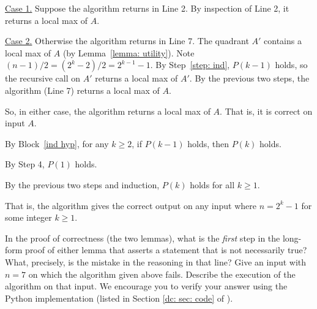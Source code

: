 \documentclass[11pt]{article}
\begin{document}
{\begin{longFormProof}
\begin{block}
      \begin{block}
        \step \underline{Case 1.} Suppose the algorithm returns in Line 2.
        \step By inspection of Line 2, it returns a local max of $A$.
      \end{block}
      \begin{block}
        \step \underline{Case 2.} Otherwise the algorithm returns in Line 7.
        \step The quadrant $A'$ contains a local max of $A$ (by Lemma~\ref{lemma: utility}).
        Note $(n-1)/2 = (2^k-2)/2 = 2^{k-1}-1$.
        \step By Step~\ref{step: ind}, $P(k-1)$ holds, so the recursive call on $A'$ returns a local max of $A'$.
        \step By the previous two steps, the algorithm (Line 7) returns a local max of $A$.
      \end{block}
      \step So, in either case, the algorithm returns a local max of $A$.  That is, it is correct on input $A$.
    \end{block}

    \step By Block~\ref{ind hyp}, for any $k\ge 2$, if $P(k-1)$ holds, then $P(k)$ holds.
    
    \step By Step 4, $P(1)$ holds.

    \step By the previous two steps and induction, $P(k)$ holds for all $k\ge 1$.

    \step That is, the algorithm gives the correct output on any input where $n=2^k-1$ for some integer $k\ge 1$.
  \end{longFormProof}

  \newpage
  {\small
    In the proof of correctness (the two lemmas),
    what is the \emph{first} step in the long-form proof of either lemma
    that asserts a statement that is not necessarily true?
    What, precisely, is the mistake in the reasoning in that line?
    Give an input with $n=7$ on which the  algorithm given above fails.
    Describe the execution of the algorithm on that input.
    We encourage you to verify your answer using the Python implementation
    (listed in Section \ref{dc: sec: code} of ).
  }
}

\setlength{\ITEMHT}{1.15in}
{
  \injectEnumerate 

}
\end{document}
